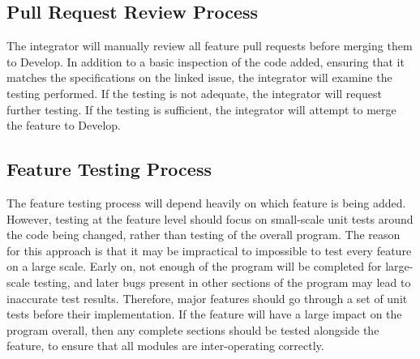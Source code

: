 \subsection{Pull Request Review Process}

The integrator will manually review all feature pull requests before merging them to Develop. In addition to a basic inspection of the code added, ensuring that it matches the specifications on the linked issue, the integrator will examine the testing performed. If the testing is not adequate, the integrator will request further testing. If the testing is sufficient, the integrator will attempt to merge the feature to Develop.

\subsection{Feature Testing Process}

The feature testing process will depend heavily on which feature is being added. However, testing at the feature level should focus on small-scale unit tests around the code being changed, rather than testing of the overall program. The reason for this approach is that it may be impractical to impossible to test every feature on a large scale. Early on, not enough of the program will be completed for large-scale testing, and later bugs present in other sections of the program may lead to inaccurate test results. Therefore, major features should go through a set of unit tests before their implementation. If the feature will have a large impact on the program overall, then any complete sections should be tested alongside the feature, to ensure that all modules are inter-operating correctly.

